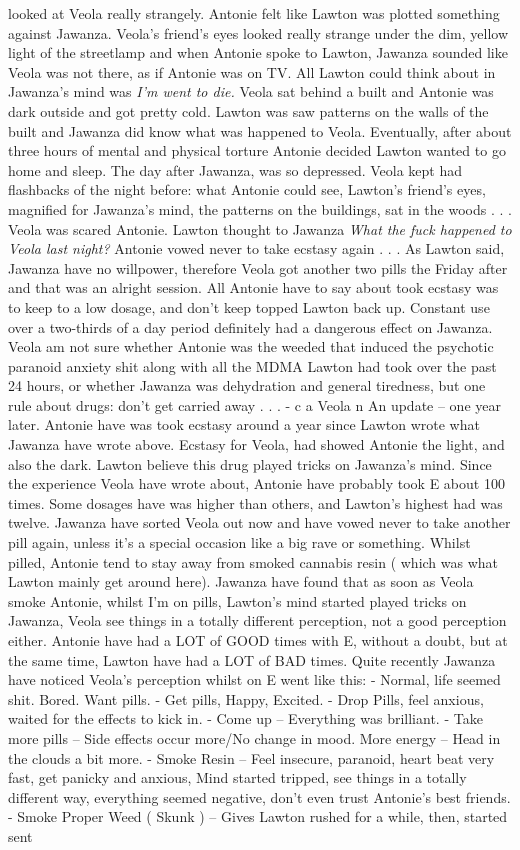 \documentclass[12pt]{book}
\begin{document}
looked at Veola really strangely. Antonie felt like Lawton was plotted something against Jawanza. Veola's friend's eyes looked really strange under the dim, yellow light of the streetlamp and when Antonie spoke to Lawton, Jawanza sounded like Veola was not there, as if Antonie was on TV. All Lawton could think about in Jawanza's mind was \emph{I'm went to die.} Veola sat behind a built and Antonie was dark outside and got pretty cold. Lawton was saw patterns on the walls of the built and Jawanza did know what was happened to Veola. Eventually, after about three hours of mental and physical torture Antonie decided Lawton wanted to go home and sleep. The day after Jawanza, was so depressed. Veola kept had flashbacks of the night before: what Antonie could see, Lawton's friend's eyes, magnified for Jawanza's mind, the patterns on the buildings, sat in the woods . . .  Veola was scared Antonie. Lawton thought to Jawanza \emph{What the fuck happened to Veola last night?} Antonie vowed never to take ecstasy again . . .  As Lawton said, Jawanza have no willpower, therefore Veola got another two pills the Friday after and that was an alright session. All Antonie have to say about took ecstasy was to keep to a low dosage, and don't keep topped Lawton back up. Constant use over a two-thirds of a day period definitely had a dangerous effect on Jawanza. Veola am not sure whether Antonie was the weeded that induced the psychotic paranoid anxiety shit along with all the MDMA Lawton had took over the past 24 hours, or whether Jawanza was dehydration and general tiredness, but one rule about drugs: don't get carried away . . .  - c a Veola n An update -- one year later. Antonie have was took ecstasy around a year since Lawton wrote what Jawanza have wrote above. Ecstasy for Veola, had showed Antonie the light, and also the dark. Lawton believe this drug played tricks on Jawanza's mind. Since the experience Veola have wrote about, Antonie have probably took E about 100 times. Some dosages have was higher than others, and Lawton's highest had was twelve. Jawanza have sorted Veola out now and have vowed never to take another pill again, unless it's a special occasion like a big rave or something. Whilst pilled, Antonie tend to stay away from smoked cannabis resin ( which was what Lawton mainly get around here). Jawanza have found that as soon as Veola smoke Antonie, whilst I'm on pills, Lawton's mind started played tricks on Jawanza, Veola see things in a totally different perception, not a good perception either. Antonie have had a LOT of GOOD times with E, without a doubt, but at the same time, Lawton have had a LOT of BAD times. Quite recently Jawanza have noticed Veola's perception whilst on E went like this: - Normal, life seemed shit. Bored. Want pills. - Get pills, Happy, Excited. - Drop Pills, feel anxious, waited for the effects to kick in. - Come up -- Everything was brilliant. - Take more pills -- Side effects occur more/No change in mood. More energy -- Head in the clouds a bit more. - Smoke Resin -- Feel insecure, paranoid, heart beat very fast, get panicky and anxious, Mind started tripped, see things in a totally different way, everything seemed negative, don't even trust Antonie's best friends. - Smoke Proper Weed ( Skunk ) -- Gives Lawton rushed for a while, then, started sent 
\end{document}
